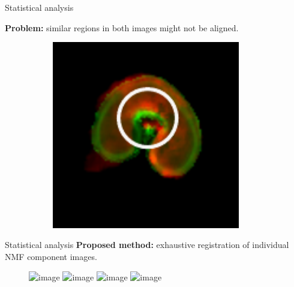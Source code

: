 \documentclass[10pt]{beamer}
\begin{document}
\begin{frame}{Statistical analysis}

  \textbf{Problem:} similar regions in both images might not be aligned.

  \begin{figure}[ht]
  \centering
  \begin{subfigure}[t]{0.33\textwidth}
    \centering
    \includegraphics[width=0.9\textwidth]{fig/overlay_t2_6_original}
  \end{subfigure}%
\end{figure}

\end{frame}


\begin{frame}{Statistical analysis}
  \textbf{Proposed method:} exhaustive registration of individual NMF component images.


  \begin{figure}[ht]
    \centering
    \includegraphics<1>[width=0.9\textwidth]{fig/translation_nmf_0}%
    \includegraphics<2>[width=0.9\textwidth]{fig/translation_nmf_1}%
    \includegraphics<3>[width=0.9\textwidth]{fig/translation_nmf_2}%
    \includegraphics<4>[width=0.9\textwidth]{fig/translation_nmf_3}%
  \end{figure}

  
\end{frame}
\end{document}

